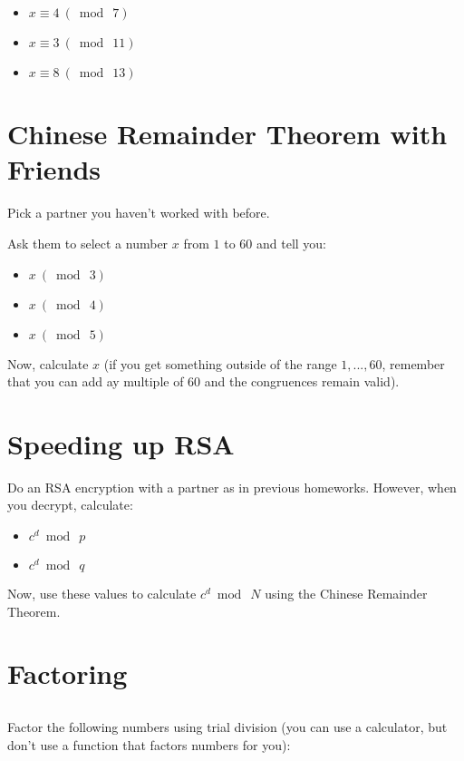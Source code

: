 \documentclass[12pt]{article}
\begin{document}
\begin{itemize}
\item $x \equiv 4 ~(\bmod~7)$
\item $x \equiv 3 ~(\bmod~11)$
\item $x \equiv 8 ~(\bmod~13)$
\end{itemize}


\section{Chinese Remainder Theorem with Friends}

Pick a partner you haven't worked with before.

Ask them to select a number $x$ from $1$ to $60$ and tell you:

\begin{itemize}
\item $x ~(\bmod~3)$
\item $x ~(\bmod~4)$
\item $x ~(\bmod~5)$
\end{itemize}

Now, calculate $x$ (if you get something outside of the range $1, ..., 60$, remember that you can add ay multiple of 60 and the congruences remain valid).


\section{Speeding up RSA}

Do an RSA encryption with a partner as in previous homeworks. However, when you decrypt, calculate:

\begin{itemize}
\item $c^d \bmod~p$
\item $c^d \bmod~q$
\end{itemize}

Now, use these values to calculate $c^d \bmod~N$ using the Chinese Remainder Theorem.

\section{Factoring}

\subsection{}

Factor the following numbers using trial division (you can use a calculator, but don't use a function that factors numbers for you):
\end{document}
